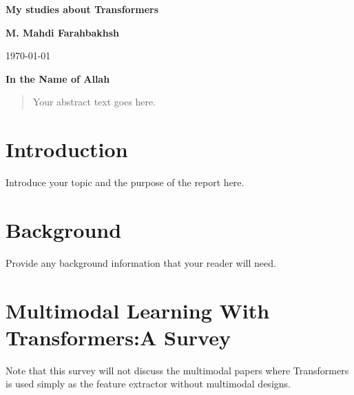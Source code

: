 \documentclass{article}
\begin{document}
	
	\begin{titlepage}
		
		\centering
		\vspace*{2cm}
		\textbf{\LARGE My studies about Transformers}
		\vspace{1cm}
		

		
		\vfill
		
		\textbf{M. Mahdi Farahbakhsh}
		
		\vspace{1cm}
		\today
	\end{titlepage}
	
	\begin{center}
		\textbf{In the Name of Allah}
	\end{center}
	\begin{abstract}
		Your abstract text goes here.
	\end{abstract}
	
	\section{Introduction}
	Introduce your topic and the purpose of the report here.
	
	\section{Background}
	Provide any background information that your reader will need.
	
	\section{Multimodal Learning With Transformers:A Survey \cite{Multimodal_survey}}
	
	Note that this survey will not discuss the multimodal papers where Transformers is used simply as the feature extractor without multimodal designs.
	
\end{document}
